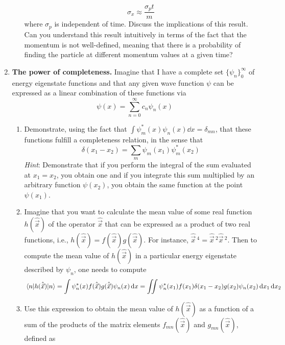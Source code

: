 \documentclass[../psets.tex]{subfiles}
\begin{document}
\begin{enumerate}
\begin{enumerate}
        \begin{equation}
            \sigma_x \approx \frac{\sigma_pt}{m}
        \end{equation}
        where $\sigma_p$ is independent of time. Discuss the implications of this result. Can you understand this result intuitively in terms of the fact that the momentum is not well-defined, meaning that there is a probability of finding the particle at different momentum values at a given time?
    \end{enumerate}
    \item \textbf{The power of completeness.} Imagine that I have a complete set $\{\psi_n\}_0^\infty$ of energy eigenstate functions and that any given wave function $\psi$ can be expressed as a linear combination of these functions via
    \begin{equation}
        \psi(x) = \sum_{n=0}^\infty c_n\psi_n(x)
    \end{equation}
    \begin{enumerate}
        \item Demonstrate, using the fact that $\int\psi_m^*(x)\psi_n(x)\dd{x}=\delta_{mn}$, that these functions fulfill a completeness relation, in the sense that
        \begin{equation}
            \delta(x_1-x_2) = \sum_m\psi_m(x_1)\psi_m^*(x_2)
        \end{equation}
        \emph{Hint}: Demonstrate that if you perform the integral of the sum evaluated at $x_1=x_2$, you obtain one and if you integrate this sum multiplied by an arbitrary function $\psi(x_2)$, you obtain the same function at the point $\psi(x_1)$.
        \item Imagine that you want to calculate the mean value of some real function $h(\hat{\vec{x}})$ of the operator $\hat{\vec{x}}$ that can be expressed as a product of two real functions, i.e., $h(\hat{\vec{x}})=f(\hat{\vec{x}})g(\hat{\vec{x}})$. For instance, $\hat{\vec{x}}{\,}^4=\hat{\vec{x}}{\,}^2\hat{\vec{x}}{\,}^2$. Then to compute the mean value of $h(\hat{\vec{x}})$ in a particular energy eigenstate described by $\psi_n$, one needs to compute
        \begin{equation}
            \ev{h(\hat{\vec{x}})}{n} = \int\psi_n^*(x)f(\hat{\vec{x}})g(\hat{\vec{x}})\psi_n(x)\dd{x}
            = \iint\psi_n^*(x_1)f(x_1)\delta(x_1-x_2)g(x_2)\psi_n(x_2)\dd{x_1}\dd{x_2}
        \end{equation}
        \item Use this expression to obtain the mean value of $h(\hat{\vec{x}})$ as a function of a sum of the products of the matrix elements $f_{mn}(\hat{\vec{x}})$ and $g_{mn}(\hat{\vec{x}})$, defined as

\end{enumerate}
\end{enumerate}
\end{document}

